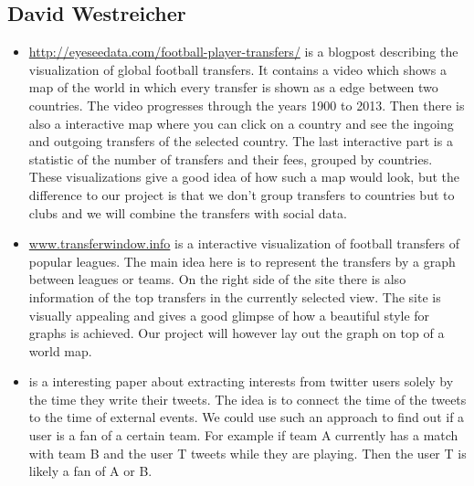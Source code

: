 \documentclass{article}
\begin{document}
\subsection{David Westreicher}
\begin{itemize}
    \item \url{http://eyeseedata.com/football-player-transfers/} is a blogpost describing the visualization of global football transfers. It contains a video which shows a map of the world in which every transfer is shown as a edge between two countries. The video progresses through the years 1900 to 2013. Then there is also a interactive map where you can click on a country and see the ingoing and outgoing transfers of the selected country. The last interactive part is a statistic of the number of transfers and their fees, grouped by countries. These visualizations give a good idea of how such a map would look, but the difference to our project is that we don't group transfers to countries but to clubs and we will combine the transfers with social data.
    \item \url{www.transferwindow.info} is a interactive visualization of football transfers of popular leagues. The main idea here is to represent the transfers by a graph between leagues or teams. On the right side of the site there is also information of the top transfers in the currently selected view. The site is visually appealing and gives a good glimpse of how a beautiful style for graphs is achieved. Our project will however lay out the graph on top of a world map.
    \item \cite{Ramasamy:2013:IUI:2512938.2512960} is a interesting paper about extracting interests from twitter users solely by the time they write their tweets. The idea is to connect the time of the tweets to the time of external events. We could use such an approach to find out if a user is a fan of a certain team. For example if team A currently has a match with team B and the user T tweets while they are playing. Then the user T is likely a fan of A or B.

\end{itemize}
\end{document}

